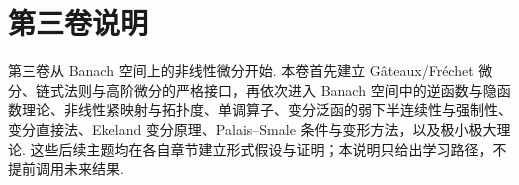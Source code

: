 \chapter*{第三卷说明}\label{preface:volume-iii}
第三卷从 Banach 空间上的非线性微分开始. 本卷首先建立 Gâteaux/Fréchet 微分、链式法则与高阶微分的严格接口，再依次进入 Banach 空间中的逆函数与隐函数理论、非线性紧映射与拓扑度、单调算子、变分泛函的弱下半连续性与强制性、变分直接法、Ekeland 变分原理、Palais--Smale 条件与变形方法，以及极小极大理论. 这些后续主题均在各自章节建立形式假设与证明；本说明只给出学习路径，不提前调用未来结果.
